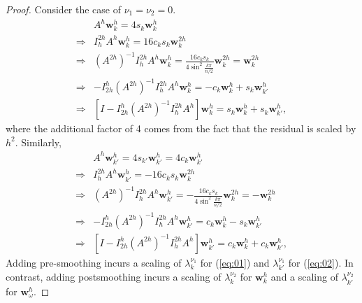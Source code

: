 \begin{proof}
  Consider the case of $\nu_1=\nu_2=0$.
  \begin{subequations}
    \begin{align}
      &A^h\mathbf{w}^h_k=4s_k\mathbf{w}^h_k\\
      \Rightarrow
      &I^{2h}_hA^h\mathbf{w}^h_k=16c_ks_k\mathbf{w}^{2h}_k
      \label{eq:residualScaled}\\
      \Rightarrow &(A^{2h})^{-1} I^{2h}_hA^h\mathbf{w}^h_k=
                    \frac{16c_ks_k}{4\sin^2\frac{k\pi}{n/2}}\mathbf{w}^{2h}_k=
                    \mathbf{w}^{2h}_k\\
      \Rightarrow &-I^h_{2h}(A^{2h})^{-1} I^{2h}_hA^h\mathbf{w}^h_k=
                    -c_k\mathbf{w}^h_k+s_k\mathbf{w}^{h}_{k'}\\
       \Rightarrow &[I-I^h_{2h}(A^{2h})^{-1} I^{2h}_hA^h]\mathbf{w}^h_k=
                    s_k\mathbf{w}^h_k+s_k\mathbf{w}^{h}_{k'},\label{eq:01}
    \end{align}
  \end{subequations}
  where the additional factor of 4 comes from the fact that
  the residual is scaled by $h^2$.
  Similarly,  \begin{subequations}
    \begin{align}
      &A^h\mathbf{w}^h_{k'}=4s_{k'}\mathbf{w}^h_{k'}=4c_k\mathbf{w}^h_{k'}
      \\
      \Rightarrow
      &I^{2h}_hA^h\mathbf{w}^h_{k'}=-16c_ks_k\mathbf{w}^{2h}_k
      \label{eq:residualScaled}\\
      \Rightarrow &(A^{2h})^{-1} I^{2h}_hA^h\mathbf{w}^h_{k'}=
                  -  \frac{16c_ks_k}{4\sin^2\frac{k\pi}{n/2}}\mathbf{w}^{2h}_k=
                    -\mathbf{w}^{2h}_k\\
      \Rightarrow &-I^h_{2h}(A^{2h})^{-1} I^{2h}_hA^h\mathbf{w}^h_{k'}=
                    c_k\mathbf{w}^h_k-s_k\mathbf{w}^{h}_{k'}\\
       \Rightarrow &[I-I^h_{2h}(A^{2h})^{-1} I^{2h}_hA^h]\mathbf{w}^h_{k'}=
                    c_k\mathbf{w}^h_k+c_k\mathbf{w}^{h}_{k'},\label{eq:02}
    \end{align}
  \end{subequations}
  Adding pre-smoothing incurs a scaling of $\lambda_k^{\nu_1}$
  for (\ref{eq:01}) and $\lambda^{\nu_1}_{k'}$ for (\ref{eq:02}).
  In contrast,
  adding postsmoothing incurs a scaling of $\lambda_k^{\nu_2}$
  for $\mathbf{w}_k^h$ and a scaling of $\lambda_{k'}^{\nu_2}$
  for $\mathbf{w}^h_{\omega}$.
\end{proof}

